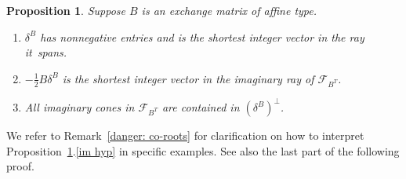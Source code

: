 \documentclass[10pt]{article}
\newtheorem{proposition}{Proposition}[section]
\theoremstyle{definition}
\theoremstyle{remark}
\numberwithin{equation}{section}
\newcommand{\F}{{\mathcal F}}
\newcommand{\0}{{\mathbf{0}}}
\begin{document}
\begin{proposition}\label{delta is the man}
Suppose $B$ is an exchange matrix of affine type.
\begin{enumerate}[label=\bf\arabic*., ref=\arabic*]
\item \label{im ray pos}
$\delta^B$ has nonnegative entries and is the shortest integer vector in the ray it~spans.  \item \label{im ray}
$-\frac12B\delta^B$ is the shortest integer vector in the imaginary ray of $\F_{B^T}$.
\item \label{im hyp}
All imaginary cones in $\F_{B^T}$ are contained in $(\delta^B)^\perp$.
\end{enumerate}
\end{proposition}

We refer to Remark~\ref{danger: co-roots} for clarification on how to interpret Proposition~\ref{delta is the man}.\ref{im hyp} in specific examples.
See also the last part of the following proof.
\end{document}
